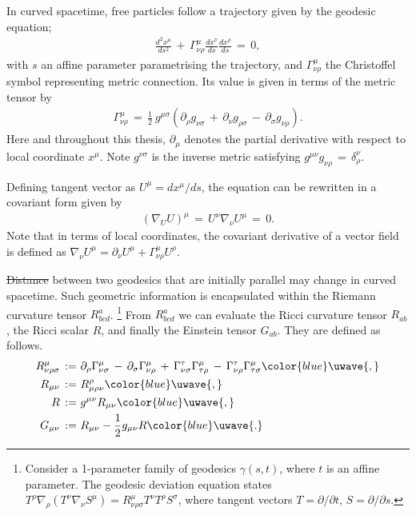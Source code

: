 \documentclass[a4paper,12pt,times,custombib,print,index]{Classes/PhDThesisPSnPDF} %
\providecommand{\DIFadd}[1]{{\protect\color{blue}\uwave{#1}}} %
\providecommand{\DIFdel}[1]{{\protect\color{red}\sout{#1}}}                      %
\providecommand{\DIFaddbegin}{} %
\providecommand{\DIFaddend}{} %
\providecommand{\DIFdelbegin}{} %
\providecommand{\DIFdelend}{} %
\newcommand{\DIFscaledelfig}{0.5}
\newlength{\DIFdelgraphicswidth} %
\newlength{\DIFdelgraphicsheight} %
\newcommand{\DIFaddincludegraphics}[2][]{{\color{blue}\fbox{\DIFOincludegraphics[#1]{#2}}}} %
\newcommand{\DIFdelincludegraphics}[2][]{%
\sbox{\DIFdelgraphicsbox}{\DIFOincludegraphics[#1]{#2}}%
\settoboxwidth{\DIFdelgraphicswidth}{\DIFdelgraphicsbox} %
\settoboxtotalheight{\DIFdelgraphicsheight}{\DIFdelgraphicsbox} %
\scalebox{\DIFscaledelfig}{%
\parbox[b]{\DIFdelgraphicswidth}{\usebox{\DIFdelgraphicsbox}\\[-\baselineskip] \rule{\DIFdelgraphicswidth}{0em}}\llap{\resizebox{\DIFdelgraphicswidth}{\DIFdelgraphicsheight}{%
\setlength{\unitlength}{\DIFdelgraphicswidth}%
\begin{picture}(1,1)%
\thicklines\linethickness{2pt} %
{\color[rgb]{1,0,0}\put(0,0){\framebox(1,1){}}}%
{\color[rgb]{1,0,0}\put(0,0){\line( 1,1){1}}}%
{\color[rgb]{1,0,0}\put(0,1){\line(1,-1){1}}}%
\end{picture}%
}\hspace*{3pt}}} %
} %
\DeclareRobustCommand{\DIFaddbegin}{\DIFOaddbegin \let\includegraphics\DIFaddincludegraphics} %
\DeclareRobustCommand{\DIFaddend}{\DIFOaddend \let\includegraphics\DIFOincludegraphics} %
\DeclareRobustCommand{\DIFdelbegin}{\DIFOdelbegin \let\includegraphics\DIFdelincludegraphics} %
\DeclareRobustCommand{\DIFdelend}{\DIFOaddend \let\includegraphics\DIFOincludegraphics} %
\begin{document}
In curved spacetime, free particles follow a trajectory given by the geodesic equation;
\begin{align}
	\frac{d^2x^\mu}{ds^2} \,+\, \Gamma^\mu_{\nu \rho} \frac{dx^\nu}{ds} \frac{dx^\rho}{ds} \,=\, 0,  \label{eqn:geodesic}
\end{align}
with $s$ an affine parameter parametrising the trajectory, and $\Gamma^\mu_{\nu\rho}$ the Christoffel symbol representing \DIFaddbegin \DIFadd{the }\DIFaddend metric connection. Its value is given in terms of the metric tensor by
\begin{align}
	\Gamma^{\mu}_{\nu\rho} \,=\, \frac{1}{2}~ g^{\mu\sigma} \left( \partial_\rho g_{\nu\sigma} \,+\, \partial_\nu g_{\rho\sigma} \,-\, \partial_\sigma g_{\nu\rho}  \right). \label{def:Levi_Civita}
\end{align}
Here and throughout this thesis, $\partial_\mu$ denotes the partial derivative with respect to local coordinate $x^\mu$. Note $g^{\nu\sigma}$ is the inverse metric satisfying $g^{\mu\nu} g_{\nu\rho} \,=\, \delta^\nu_\rho$.

Defining \DIFaddbegin \DIFadd{the }\DIFaddend tangent vector as $U^\mu = dx^\mu / ds$, the equation can be rewritten in a covariant form given by
\begin{align}
	\left( \nabla_U U \right)^\mu \,=\, U^\nu \nabla_\nu U^\mu \,=\, 0. \label{eqn:geodesic_covariant}
\end{align}
Note that in terms of local coordinates, the covariant derivative of a vector field is defined as $\nabla_\nu U^\mu = \partial_\nu U^\mu + \Gamma^\mu_{\nu\rho} U^\rho$.

\DIFdelbegin \DIFdel{Distance }\DIFdelend \DIFaddbegin \DIFadd{The distance }\DIFaddend between two geodesics that are initially parallel may change in curved spacetime. Such geometric information is encapsulated within the Riemann curvature tensor $R^a_{bcd}$. \footnote{Consider a 1-parameter family of geodesics $\gamma(s,t)$, where $t$ is an affine parameter. The geodesic deviation equation states $T^\rho \nabla_\rho ( T^\nu \nabla_\nu S^\mu ) = R^\mu_{\nu\rho\sigma} T^\nu T^\rho S^\sigma$, where tangent vectors $T=\partial/\partial t$, $S=\partial/\partial s$.} From $R^a_{bcd}$ we can evaluate the Ricci curvature tensor $R_{ab}$, the Ricci scalar $R$, and finally the Einstein tensor $G_{ab}$. They are defined as follows.
\begin{align}
	R^\mu_{\nu\rho\sigma} \,:=& \,\, \partial_\rho \Gamma^\mu_{\nu\sigma} \,-\, \partial_\sigma \Gamma^\mu_{\nu\rho} \,+\, \Gamma^\tau_{\nu\sigma} \Gamma^\mu_{\tau\rho} \,-\, \Gamma^\tau_{\nu\rho} \Gamma^\mu_{\tau\sigma}\DIFaddbegin \DIFadd{,  }\DIFaddend \label{def:Riemann_tensor}\\
	R_{\mu\nu} \,:=& \,\, R^\rho_{\mu\rho\nu}\DIFaddbegin \DIFadd{,  }\DIFaddend \\ R \,:=& \,\, g^{\mu\nu} R_{\mu\nu}\DIFaddbegin \DIFadd{, }\DIFaddend \\
	G_{\mu\nu} \,:=& \,\, R_{\mu\nu} - \frac{1}{2} g_{\mu\nu} R\DIFaddbegin \DIFadd{. }\DIFaddend \label{def:Einstein_tensor}
\end{align}
\end{document}
